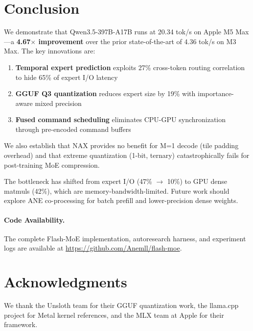\documentclass[11pt,twocolumn]{article}
\begin{document}
\section{Conclusion}

We demonstrate that Qwen3.5-397B-A17B runs at 20.34 tok/s on Apple M5 Max---a \textbf{4.67$\times$ improvement} over the prior state-of-the-art of 4.36 tok/s on M3 Max. The key innovations are:

\begin{enumerate}
    \item \textbf{Temporal expert prediction} exploits 27\% cross-token routing correlation to hide 65\% of expert I/O latency
    \item \textbf{GGUF Q3 quantization} reduces expert size by 19\% with importance-aware mixed precision
    \item \textbf{Fused command scheduling} eliminates CPU-GPU synchronization through pre-encoded command buffers
\end{enumerate}

We also establish that NAX provides no benefit for M=1 decode (tile padding overhead) and that extreme quantization (1-bit, ternary) catastrophically fails for post-training MoE compression.

The bottleneck has shifted from expert I/O (47\% $\rightarrow$ 10\%) to GPU dense matmuls (42\%), which are memory-bandwidth-limited. Future work should explore ANE co-processing for batch prefill and lower-precision dense weights.

\paragraph{Code Availability.} The complete Flash-MoE implementation, autoresearch harness, and experiment logs are available at \url{https://github.com/Anemll/flash-moe}.

\section*{Acknowledgments}

We thank the Unsloth team for their GGUF quantization work, the llama.cpp project for Metal kernel references, and the MLX team at Apple for their framework.
\end{document}

